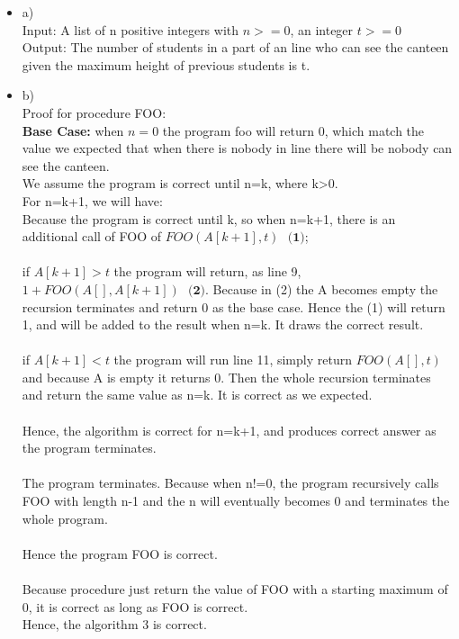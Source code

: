 \documentclass[12pt]{article}
\begin{document}
\begin{itemize}
    \item a) \\
        Input: A list of n positive integers with $n>=0$, an integer $ t>= 0$\\
        Output: The number of students in a part of an line who can see the canteen given the maximum height of previous students is t. \\

    \item b)\\
        Proof for procedure FOO:\\
        \textbf{Base Case:} when $n=0$ the program foo will return 0, which match the value we expected that when there is nobody in line there will be nobody can see the canteen. \\
        We assume the program is correct until n=k, where k>0.\\
        For n=k+1, we will have:\\
        Because the program is correct until k, so when n=k+1, there is an additional call of FOO of $FOO(A[k+1], t)\,\,\,\,\textbf{(1)}$;\\
        \\
        if $A[k+1]>t$ the program will return, as line 9, $1+FOO(A[], A[k+1])\,\,\,\,\textbf{(2)}$. Because in (2) the A becomes empty the recursion terminates and return 0 as the base case. Hence the (1) will return 1, and will be added to the result when n=k. It draws the correct result. \\
        \\
        if $A[k+1]<t$ the program will run line 11, simply return $FOO(A[], t)$ and because A is empty it returns 0. Then the whole recursion terminates and return the same value as n=k. It is correct as we expected.\\
        \\
        Hence, the algorithm is correct for n=k+1, and produces correct answer as the program terminates.\\
        \\
        The program terminates. Because when n!=0, the program recursively calls FOO with length n-1 and the n will eventually becomes 0 and terminates the whole program. \\
        \\
        Hence the program FOO is correct.\\
        \\
        Because procedure just return the value of FOO with a starting maximum of 0, it is correct as long as FOO is correct. \\
        Hence, the algorithm 3 is correct. 

\end{itemize}
\end{document}
